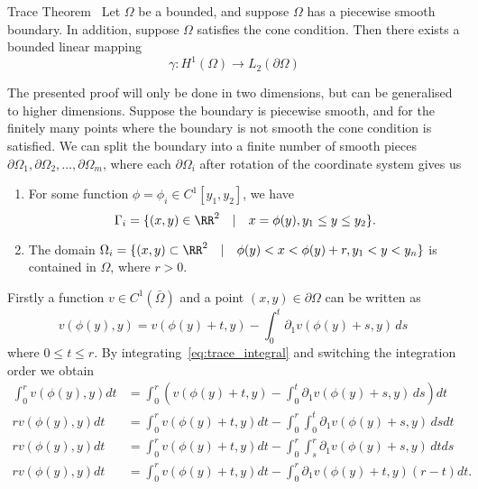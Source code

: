 \begin{thmx}{Trace Theorem}~\label{thm:trace}
    Let $\Omega$ be a bounded, and suppose $\Omega$ has a piecewise smooth boundary. In addition, suppose $\Omega$ satisfies the cone condition. Then there exists a bounded linear mapping 
    \begin{equation*}
        \gamma : H^1(\Omega) \to L_2(\partial \Omega)
    \end{equation*}
\end{thmx}
\begin{bev}
    The presented proof will only be done in two dimensions, but can be generalised to higher dimensions.
    Suppose the boundary is piecewise smooth, and for the finitely many points where the boundary is not smooth the cone condition is satisfied. We can split the boundary into a finite number of smooth pieces $\partial \Omega_1, \partial \Omega_2, \dots, \partial \Omega_m$, where each $\partial \Omega_i$ after rotation of the coordinate system gives us
    \begin{enumerate}
        \item For some function $\phi = \phi_i \in C^1[y_1, y_2]$, we have
            \[ \Gamma_i = \{ (x,y) \in \RR^2 \quad | \quad x = \phi(y), y_1 \leq y \leq y_2 \}. \]
        \item The domain $\Omega_i = \{ (x,y) \subset \RR^2 \quad | \quad \phi(y) < x <\phi(y) + r, y_1 < y < y_n \}$ is contained in $\Omega$, where $r > 0$. 
    \end{enumerate}
    Firstly a function $v \in C^1(\bar{\Omega})$ and a point $(x,y) \in \partial \Omega$ can be written as
    \begin{equation}
            v(\phi(y), y) = v(\phi(y) + t, y) - \int_0^t \partial_1 v(\phi(y) + s, y) \, ds~\label{eq:trace_integral}
    \end{equation}
    where $0 \leq t \leq r$. By integrating~\eqref{eq:trace_integral} and switching the integration order we obtain 
    \begin{align*}
        \int_0^r v(\phi(y), y) dt &= \int_0^r \left(   v(\phi(y) + t, y) - \int_0^t \partial_1 v(\phi(y) + s, y) \, ds \right) dt \\
        r v(\phi(y), y) dt &= \int_0^r   v(\phi(y) + t, y) dt - \int_0^r \int_0^t \partial_1 v(\phi(y) + s, y) \, ds dt \\
        r v(\phi(y), y) dt &= \int_0^r   v(\phi(y) + t, y) dt - \int_0^r \int_s^r \partial_1 v(\phi(y) + s, y) \, dt ds \\
        r v(\phi(y), y) dt &= \int_0^r v(\phi(y) + t, y) dt - \int_0^r \partial_1 v(\phi(y) + t, y)(r-t) dt.

\end{align*}
\end{bev}
